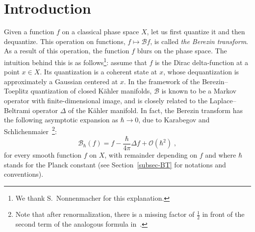 \documentclass[11pt]{article}
\theoremstyle{definition}
\numberwithin{equation}{section}
\numberwithin{figure}{section}
\numberwithin{table}{section}
\newcommand{\cB}{{\mathcal{B}}}
\newcommand{\bigo}{\mathcal{O}}
\newcommand\< {\mathcal{h}}
\renewcommand\> {\mathcal{i}}
\begin{document}
\section{Introduction}

Given a function $f$ on a classical phase space $X$, let us first quantize it and then dequantize. This operation on functions, $f \mapsto \cB f$, is called \emph{the Berezin transform}. As a result of this operation, the function $f$ blurs on the phase space. The intuition behind this is as follows\footnote{We thank S.~Nonnenmacher for this explanation.}: assume that $f$ is the Dirac delta-function at a point $x \in X$. Its quantization is a coherent state at $x$, whose dequantization is approximately a Gaussian centered at $x$. In the framework of the Berezin--Toeplitz quantization of closed K\"ahler manifolds, $\cB$ is known to be a Markov operator with finite-dimensional image, and is closely related to the Laplace--Beltrami operator $\Delta$ of the K\"ahler manifold. In fact, the Berezin transform has the following asymptotic expansion as $\hbar\to 0$, due to Karabegov and Schlichenmaier~\cite{KS01}\footnote{Note that after renormalization, there is a missing factor of $\frac{1}{2}$ in front of the second term of the analogous formula in~\cite[(1.2)]{KS01}.}:
\begin{equation}\label{eq-asymp}
\cB_\hbar(f)= f-\frac{\hbar}{4\pi}\Delta f + \bigo(\hbar^2)\;,
\end{equation}
for every smooth function $f$ on $X$, with remainder depending on $f$ and where $\hbar$ stands for the Planck constant (see Section~\ref{subsec-BT} for notations and conventions).
\end{document}
